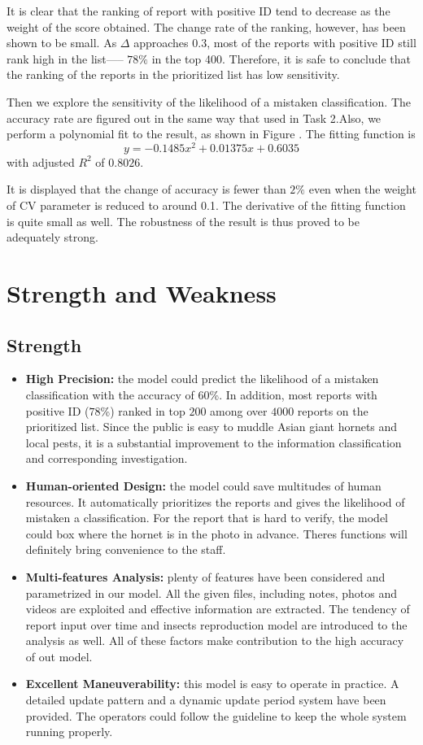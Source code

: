 \documentclass{mcmthesis}
\begin{document}
 It is clear that the ranking of report with positive ID tend to decrease as the weight of the score obtained. The change rate of the ranking, however, has been shown to be small. As   $\Delta$ approaches $0.3$, most of the reports with positive ID still rank high in the list----- $78\%$ in the top 400. Therefore, it is safe to conclude that the ranking of the reports in the prioritized list has low sensitivity.
 
 	Then we explore the sensitivity of the likelihood of a mistaken classification. The accuracy rate are figured out in the same way that used in Task 2.Also, we perform a polynomial fit to the result, as shown in Figure \label{fig_sen2}. The fitting function is 
	\begin{equation*}
		y = -0.1485 x^{2}+0.01375x+0.6035
	\end{equation*}
 	with adjusted $R^{2}$ of $0.8026$.

	It is displayed that the change of accuracy is fewer than $2\%$ even when the weight of CV parameter is reduced to around 0.1. The derivative of the fitting function is quite small as well. The robustness of the result is thus proved to be adequately strong.
\section{Strength and Weakness}
	\subsection{Strength}
		\begin{itemize}
			\item \textbf{High Precision:} the model could predict the likelihood of a mistaken classification with the accuracy of $60$\%. In addition, most reports with positive ID ($78$\%) ranked in top $200$ among over $4000$ reports on the prioritized list. Since the public is easy to muddle Asian giant hornets and local pests, it is a substantial improvement to the information classification and corresponding investigation.
			\item \textbf{Human-oriented Design:} the model could save multitudes of human resources. It automatically prioritizes the reports and gives the likelihood of mistaken a classification. For the report that is hard to verify, the model could box where the hornet is in the photo in advance. Theres functions will definitely bring convenience to the staff.
			\item \textbf{Multi-features Analysis:} plenty of features have been considered and parametrized in our model. All the given files, including notes, photos and videos are exploited and effective information are extracted.  The tendency of report input over time and insects reproduction model are introduced to the analysis as well. All of these factors make contribution to the high accuracy of out model.
			\item \textbf{Excellent Maneuverability:} this model is easy to operate in practice. A detailed update pattern and a dynamic update period system have been provided. The operators could follow the guideline to keep the whole system running properly.
		\end{itemize}
\end{document}
